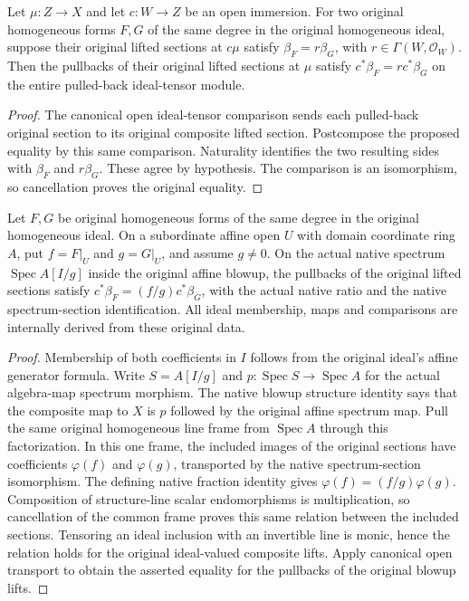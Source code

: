 \begin{proposition}
\label{prop:whole-original-form-scalar-transport}
\leanok
{}
Let $\mu:Z\to X$ and let $c:W\to Z$ be an open immersion. For two original homogeneous forms $F,G$ of the same degree in the original homogeneous ideal, suppose their original lifted sections at $c\mu$ satisfy $\beta_F=r\beta_G$, with $r\in\Gamma(W,\mathcal O_W)$. Then the pullbacks of their original lifted sections at $\mu$ satisfy $c^*\beta_F=r c^*\beta_G$ on the entire pulled-back ideal-tensor module.
\end{proposition}
\begin{proof}
The canonical open ideal-tensor comparison sends each pulled-back original section to its original composite lifted section. Postcompose the proposed equality by this same comparison. Naturality identifies the two resulting sides with $\beta_F$ and $r\beta_G$. These agree by hypothesis. The comparison is an isomorphism, so cancellation proves the original equality.
\end{proof}

\begin{proposition}
\label{prop:whole-original-form-fraction-ratios}
\leanok
{}
Let $F,G$ be original homogeneous forms of the same degree in the original homogeneous ideal. On a subordinate affine open $U$ with domain coordinate ring $A$, put $f=F|_U$ and $g=G|_U$, and assume $g\ne0$. On the actual native spectrum $\operatorname{Spec} A[I/g]$ inside the original affine blowup, the pullbacks of the original lifted sections satisfy $c^*\beta_F=(f/g)c^*\beta_G$, with the actual native ratio and the native spectrum-section identification. All ideal membership, maps and comparisons are internally derived from these original data.
\end{proposition}
\begin{proof}
Membership of both coefficients in $I$ follows from the original ideal's affine generator formula. Write $S=A[I/g]$ and $p:\operatorname{Spec}S\to\operatorname{Spec}A$ for the actual algebra-map spectrum morphism. The native blowup structure identity says that the composite map to $X$ is $p$ followed by the original affine spectrum map. Pull the same original homogeneous line frame from $\operatorname{Spec}A$ through this factorization. In this one frame, the included images of the original sections have coefficients $\varphi(f)$ and $\varphi(g)$, transported by the native spectrum-section isomorphism. The defining native fraction identity gives $\varphi(f)=(f/g)\varphi(g)$. Composition of structure-line scalar endomorphisms is multiplication, so cancellation of the common frame proves this same relation between the included sections. Tensoring an ideal inclusion with an invertible line is monic, hence the relation holds for the original ideal-valued composite lifts. Apply canonical open transport to obtain the asserted equality for the pullbacks of the original blowup lifts.
\end{proof}
